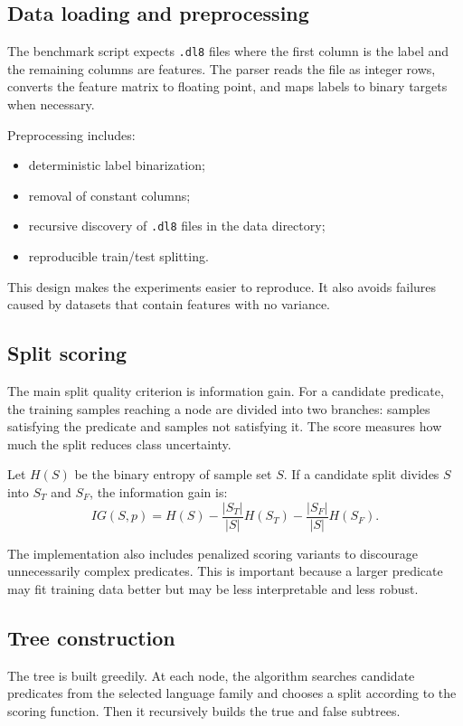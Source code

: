 \documentclass[11pt,a4paper]{article}
\begin{document}
\subsection{Data loading and preprocessing}

The benchmark script expects \texttt{.dl8} files where the first column is the label and the remaining columns are features. The parser reads the file as integer rows, converts the feature matrix to floating point, and maps labels to binary targets when necessary.

Preprocessing includes:
\begin{itemize}
    \item deterministic label binarization;
    \item removal of constant columns;
    \item recursive discovery of \texttt{.dl8} files in the data directory;
    \item reproducible train/test splitting.
\end{itemize}

This design makes the experiments easier to reproduce. It also avoids failures caused by datasets that contain features with no variance.

\subsection{Split scoring}

The main split quality criterion is information gain. For a candidate predicate, the training samples reaching a node are divided into two branches: samples satisfying the predicate and samples not satisfying it. The score measures how much the split reduces class uncertainty.

Let $H(S)$ be the binary entropy of sample set $S$. If a candidate split divides $S$ into $S_T$ and $S_F$, the information gain is:
\[
    IG(S, p) = H(S)
      - \frac{|S_T|}{|S|} H(S_T)
      - \frac{|S_F|}{|S|} H(S_F).
\]

The implementation also includes penalized scoring variants to discourage unnecessarily complex predicates. This is important because a larger predicate may fit training data better but may be less interpretable and less robust.

\subsection{Tree construction}

The tree is built greedily. At each node, the algorithm searches candidate predicates from the selected language family and chooses a split according to the scoring function. Then it recursively builds the true and false subtrees.
\end{document}
